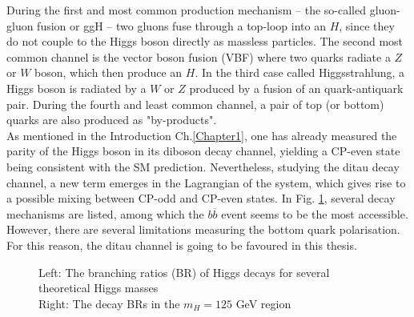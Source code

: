 During the first and most common production mechanism -- the so-called gluon-gluon fusion or ggH -- two gluons fuse through a top-loop into an $H$, since they do not couple to the Higgs boson directly as massless particles. The second most common channel is the vector boson fusion (VBF) where two quarks radiate a $Z$ or $W$ boson, which then produce an $H$. In the third case called Higgsstrahlung, a Higgs boson is radiated by a $W$ or $Z$ produced by a fusion of an quark-antiquark pair. During the fourth and least common channel, a pair of top (or bottom) quarks are also produced as "by-products". \\
As mentioned in the Introduction Ch.\ref{Chapter1}, one has already measured the parity of the Higgs boson in its diboson decay channel, yielding a CP-even state being consistent with the SM prediction. Nevertheless, studying the ditau decay channel, a new term emerges in the Lagrangian of the system, which gives rise to a possible mixing between CP-odd and CP-even states. In Fig. \ref{fig:Higgs_decays}, several decay mechanisms are listed, among which the $b\overline{b}$ event seems to be the most accessible. However, there are several limitations measuring the bottom quark polarisation. For this reason, the ditau channel is going to be favoured in this thesis.
\begin{figure}[h]
	\centering
		
	\caption{Left: The branching ratios (BR) of Higgs decays for several theoretical Higgs masses\\Right: The decay BRs in the $m_H = 125$ GeV region}
	\label{fig:Higgs_decays}
\end{figure}
